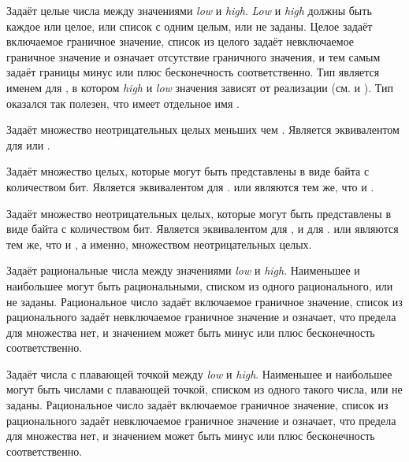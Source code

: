 \begin{flushdesc}

\item[\cd{(integer \emph{low} \emph{high})}]
  Задаёт целые числа между значениями \emph{low} и
  \emph{high}. \emph{Low} и \emph{high} должны быть
  каждое или целое, или список с одним целым, или не заданы.
  Целое задаёт включаемое граничное значение, список из целого задаёт невключаемое
  граничное значение и \cd{*} означает отсутствие граничного значения, и тем самым
  задаёт границы минус или плюс бесконечность соответственно.
  Тип  является именем для , в котором \emph{high} и \emph{low}
  значения зависят от реализации (см.  и
  ).
  Тип  оказался так полезен, что имеет отдельное имя .

\item[\cd{(mod \emph{n})}]
  Задаёт множество неотрицательных целых меньших чем . Является эквивалентом
  для  или .

\item[\cd{(signed-byte \emph{s})}]
  Задаёт множество целых, которые могут быть представлены в виде байта с 
  количеством бит. Является эквивалентом для .
   или  являются тем же, что и .

\item[\cd{(unsigned-byte \emph{s})}]
  Задаёт множество неотрицательных целых, которые могут быть представлены в виде байта с 
  количеством бит. Является эквивалентом для , и для .
   или  являются тем же, что и
  , а именно, множеством неотрицательных целых.

\item[\cd{(rational \emph{low} \emph{high})}]
  Задаёт рациональные числа между значениями \emph{low} и
  \emph{high}. Наименьшее и наибольшее могут быть рациональными, списком
  из одного рационального, или не заданы.
  Рациональное число задаёт включаемое граничное значение, список из
  рационального задаёт невключаемое граничное значение и \cd{*} означает, что
  предела для множества нет, и значением может быть минус или плюс бесконечность соответственно.

\item[\cd{(float \emph{low} \emph{high})}]
  Задаёт числа с плавающей точкой  между \emph{low} и
  \emph{high}. Наименьшее и наибольшее могут быть числами с плавающей точкой, списком
  из одного такого числа, или не заданы.
  Рациональное число задаёт включаемое граничное значение, список из
  рационального задаёт невключаемое граничное значение и \cd{*} означает, что
  предела для множества нет, и значением может быть минус или плюс бесконечность
  соответственно.


\end{flushdesc}
